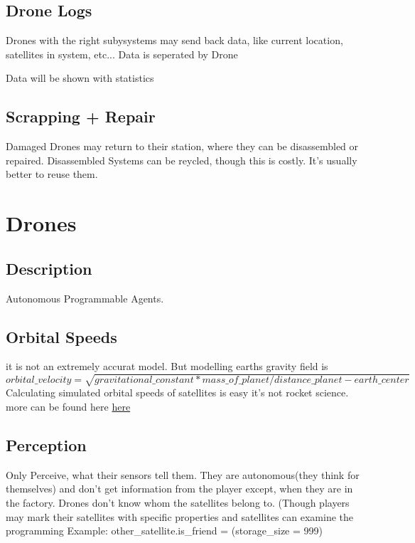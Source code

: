 \documentclass[a4paper]{scrreprt}
\begin{document}
    \section{Drone Logs}
        Drones with the right subysystems may send back data, like current location, satellites in system, etc...
        Data is seperated by Drone
        \begin{alpha}
        Data will be shown with statistics
        \end{alpha}
    \begin{alpha}
    \section{Scrapping + Repair}
        Damaged Drones may return  to their station, where they can be disassembled or repaired.
        Disassembled Systems can be reycled, though this is costly. It's usually better to reuse them.
    \end{alpha}

\chapter{Drones}
\section{Description}
    Autonomous Programmable Agents.
\section{Orbital Speeds}
    it is not an extremely accurat model. But modelling earths gravity field is \\
    $orbital\_velocity = \sqrt{gravitational\_constant * mass\_of\_planet / distance\_planet-earth\_center}$\\
    Calculating simulated orbital speeds of satellites is easy it's not rocket science.
    more can be found here \href{https://www.physicsclassroom.com/class/circles/Lesson-4/Mathematics-of-Satellite-Motion}{here}
\section{Perception}
    Only Perceive, what their sensors tell them.
    They are autonomous(they think for themselves) and don't get information from the player except, when they are in the factory.
    Drones don't know whom the satellites belong to. (Though players may mark their satellites with specific properties and satellites can examine the programming Example: other\_satellite.is\_friend = (storage\_size = 999)
\end{document}
